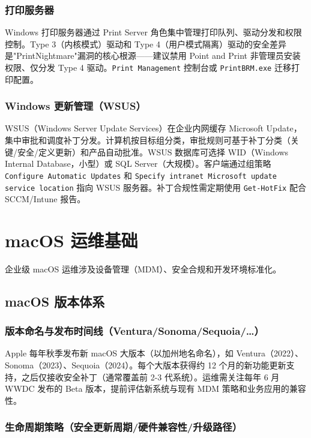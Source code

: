 \documentclass[12pt,UTF8]{ctexbook}
\begin{document}
    \subsection{打印服务器}

Windows 打印服务器通过 Print Server 角色集中管理打印队列、驱动分发和权限控制。Type 3（内核模式）驱动和 Type 4（用户模式隔离）驱动的安全差异是"PrintNightmare"漏洞的核心根源——建议禁用 Point and Print 非管理员安装权限、仅分发 Type 4 驱动。\texttt{Print Management} 控制台或 \texttt{PrintBRM.exe} 迁移打印配置。

    \subsection{Windows 更新管理（WSUS）}

WSUS（Windows Server Update Services）在企业内网缓存 Microsoft Update，集中审批和调度补丁分发。计算机按目标组分类，审批规则可基于补丁分类（关键/安全/定义更新）和产品自动批准。WSUS 数据库可选择 WID（Windows Internal Database，小型）或 SQL Server（大规模）。客户端通过组策略 \texttt{Configure Automatic Updates} 和 \texttt{Specify intranet Microsoft update service location} 指向 WSUS 服务器。补丁合规性需定期使用 \texttt{Get-HotFix} 配合 SCCM/Intune 报告。


\chapter{macOS 运维基础}
\label{chap:macos}

企业级 macOS 运维涉及设备管理（MDM）、安全合规和开发环境标准化。

  \section{macOS 版本体系}
    \subsection{版本命名与发布时间线（Ventura/Sonoma/Sequoia/…）}

Apple 每年秋季发布新 macOS 大版本（以加州地名命名），如 Ventura（2022）、Sonoma（2023）、Sequoia（2024）。每个大版本获得约 12 个月的新功能更新支持，之后仅接收安全补丁（通常覆盖前 2-3 代系统）。运维需关注每年 6 月 WWDC 发布的 Beta 版本，提前评估新系统与现有 MDM 策略和业务应用的兼容性。

    \subsection{生命周期策略（安全更新周期/硬件兼容性/升级路径）}
\end{document}
